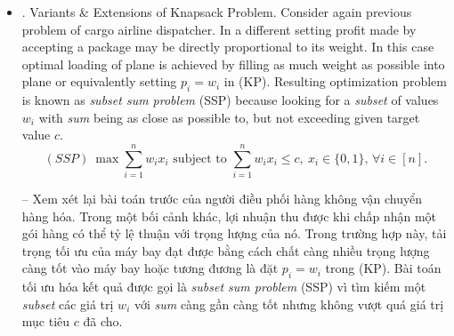 \documentclass{article}
\begin{document}
\begin{itemize}
\begin{itemize}
        
        {\sc Skiena} [437 reports an analysis of a quarter of a million requests to Stony Brook Algorithms Repository, to determine relative level of interest among 75 algorithmic problems. In this analysis it turns out: codes for knapsack problem are among top-20 of most most requested algorithms. When comparing interest to number of actual knapsack implementations, {\sc Skiena} concludes: knapsack algorithms are 3rd most needed implementations. Research should not be driven by demand figures alone, but analysis indicates: knapsack problems occur in many real-life applications \& solution of these problems is of vital interest both to industry \& administration.
        
        -- {\sc Skiena} [437 báo cáo phân tích một phần tư triệu yêu cầu gửi đến Stony Brook Algorithms Repository, để xác định mức độ quan tâm tương đối trong số 75 vấn đề thuật toán. Trong phân tích này, kết quả cho thấy: mã cho vấn đề knapsack nằm trong top 20 thuật toán được yêu cầu nhiều nhất. Khi so sánh mức độ quan tâm với số lượng triển khai knapsack thực tế, {\sc Skiena} kết luận: thuật toán knapsack là triển khai cần thiết thứ 3. Nghiên cứu không nên chỉ dựa trên số liệu nhu cầu, nhưng phân tích chỉ ra rằng: vấn đề knapsack xảy ra trong nhiều ứng dụng thực tế \& giải pháp của những vấn đề này có ý nghĩa sống còn đối với cả ngành \& quản lý.
        \item {. Variants \& Extensions of Knapsack Problem.} Consider again previous problem of cargo airline dispatcher. In a different setting profit made by accepting a package may be directly proportional to its weight. In this case optimal loading of plane is achieved by filling as much weight as possible into plane or equivalently setting $p_i = w_i$ in (KP). Resulting optimization problem is known as {\it subset sum problem} (SSP) because looking for a {\it subset} of values $w_i$ with {\it sum} being as close as possible to, but not exceeding given target value $c$.
        \begin{equation*}
            (SSP)\ \max\sum_{i=1}^n w_ix_i\mbox{ subject to }\sum_{i=1}^n w_ix_i\le c,\ x_i\in\{0,1\},\,\forall i\in[n].
        \end{equation*}
        
        -- Xem xét lại bài toán trước của người điều phối hàng không vận chuyển hàng hóa. Trong một bối cảnh khác, lợi nhuận thu được khi chấp nhận một gói hàng có thể tỷ lệ thuận với trọng lượng của nó. Trong trường hợp này, tải trọng tối ưu của máy bay đạt được bằng cách chất càng nhiều trọng lượng càng tốt vào máy bay hoặc tương đương là đặt $p_i = w_i$ trong (KP). Bài toán tối ưu hóa kết quả được gọi là {\it subset sum problem} (SSP) vì tìm kiếm một {\it subset} các giá trị $w_i$ với {\it sum} càng gần càng tốt nhưng không vượt quá giá trị mục tiêu $c$ đã cho.
        

\end{itemize}
\end{itemize}
\end{document}
